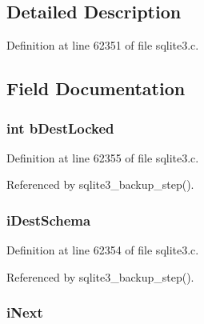 \subsection{Detailed Description}


Definition at line 62351 of file sqlite3.\+c.



\subsection{Field Documentation}
\hypertarget{structsqlite3__backup_a6eb18cf037082296899340a3b2200425}{}
\subsubsection[{b\+Dest\+Locked}]{\setlength{\rightskip}{0pt plus 5cm}int b\+Dest\+Locked}\label{structsqlite3__backup_a6eb18cf037082296899340a3b2200425}


Definition at line 62355 of file sqlite3.\+c.



Referenced by sqlite3\+\_\+backup\+\_\+step().

\hypertarget{structsqlite3__backup_aefa4865e79a3a7868ca8177fa42130b1}{}
\subsubsection[{i\+Dest\+Schema}]{ i\+Dest\+Schema}\label{structsqlite3__backup_aefa4865e79a3a7868ca8177fa42130b1}


Definition at line 62354 of file sqlite3.\+c.



Referenced by sqlite3\+\_\+backup\+\_\+step().

\hypertarget{structsqlite3__backup_a1f54c0b52e2d890531dd9d7c9b8961b0}{}
\subsubsection[{i\+Next}]{ i\+Next}\label{structsqlite3__backup_a1f54c0b52e2d890531dd9d7c9b8961b0}


